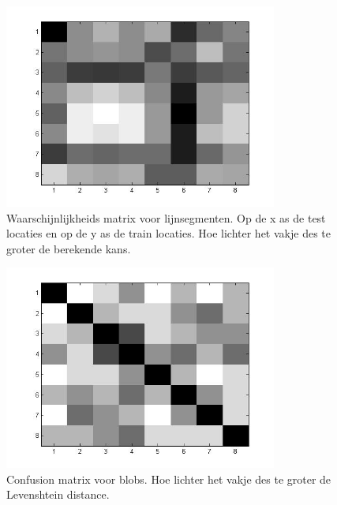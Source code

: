 \documentclass[a4paper]{article}
\begin{document}
\begin{figure}[h]
	\centering
	\includegraphics[width=0.8\textwidth]{line_prob.jpg}
	\caption{Waarschijnlijkheids matrix voor lijnsegmenten. Op de x as de test locaties en op de y as de train locaties. Hoe lichter het vakje des te groter de berekende kans.}
	\label{fig:line_prob}
\end{figure}

\begin{figure}[h]
	\centering
	\includegraphics[width=0.8\textwidth]{confusion_blob.jpg}
	\caption{Confusion matrix voor blobs. Hoe lichter het vakje des te groter de Levenshtein distance.}
	\label{fig:confusion_blob}
\end{figure}
\end{document}

